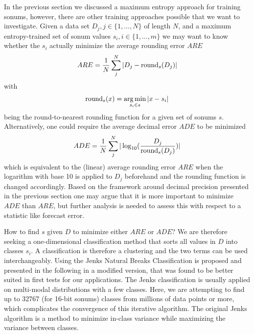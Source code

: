 

In the previous section we discussed a maximum entropy approach for training sonums, however, there are other training approaches possible that we want to investigate. Given a data set $D_j, j \in \{1,...,N\}$ of length $N$, and a maximum entropy-trained set of sonum values $s_i, i \in \{1,...,m\}$ we may want to know whether the $s_i$ actually minimize the average rounding error $ARE$
\begin{equation}
    ARE = \frac{1}{N}\sum_j^N \vert D_j - \operatorname{round}_s(D_j) \vert
    \label{eq:ARE}
\end{equation}
with
\begin{equation}
    \operatorname{round}_s(x) = \operatorname*{arg\,min}_{s_i \in s} \vert x - s_i \vert
    \label{eq:rounds}
\end{equation}
being the round-to-nearest rounding function for a given set of sonums $s$. Alternatively, one could require the average decimal error $ADE$ to be minimized
\begin{equation}
    ADE = \frac{1}{N}\sum_j^N \vert \log_{10}(\frac{D_j}{\operatorname{round}_s(D_j)}) \vert
    \label{eq:ADE}
\end{equation}
which is equivalent to the (linear) average rounding error $ARE$ when the logarithm with base 10 is applied to $D_j$ beforehand and the rounding function is changed accordingly. Based on the framework around decimal precision presented in the previous section one may argue that it is more important to minimize $ADE$ than $ARE$, but further analysis is needed to assess this with respect to a statistic like forecast error.

How to find $s$ given $D$ to minimize either $ARE$ or $ADE$? We are therefore seeking a one-dimensional classification method that sorts all values in $D$ into classes $s_i$. A classification is therefore a clustering and the two terms can be used interchangeably. Using the Jenks Natural Breaks Classification \citep{Jenks1971} is proposed and presented in the following in a modified version, that was found to be better suited in first tests for our applications. The Jenks classification is usually applied on multi-modal distributions with a few classes. Here, we are attempting to find up to 32767 (for 16-bit sonums) classes from millions of data points or more, which complicates the convergence of this iterative algorithm.  The original Jenks algorithm is a method to minimize in-class variance while maximizing the variance between classes.

